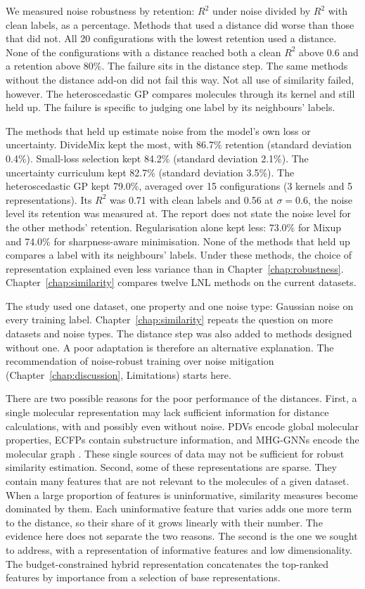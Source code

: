 We measured noise robustness by retention: $R^2$ under noise divided by $R^2$ with clean labels, as a percentage. Methods that used a distance did worse than those that did not. All 20 configurations with the lowest retention used a distance. None of the configurations with a distance reached both a clean $R^2$ above 0.6 and a retention above 80\%. The failure sits in the distance step. The same methods without the distance add-on did not fail this way. Not all use of similarity failed, however. The heteroscedastic GP compares molecules through its kernel and still held up. The failure is specific to judging one label by its neighbours' labels.

The methods that held up estimate noise from the model's own loss or uncertainty. DivideMix \citep{li2020dividemix} kept the most, with 86.7\% retention (standard deviation 0.4\%). Small-loss selection \citep{Han2018} kept 84.2\% (standard deviation 2.1\%). The uncertainty curriculum \citep{Bengio2009} kept 82.7\% (standard deviation 3.5\%). The heteroscedastic GP \citep{liu2020} kept 79.0\%, averaged over 15 configurations (3 kernels and 5 representations). Its $R^2$ was 0.71 with clean labels and 0.56 at $\sigma = 0.6$, the noise level its retention was measured at. The report does not state the noise level for the other methods' retention. Regularisation alone kept less: 73.0\% for Mixup and 74.0\% for sharpness-aware minimisation. None of the methods that held up compares a label with its neighbours' labels. Under these methods, the choice of representation explained even less variance than in Chapter~\ref{chap:robustness}. Chapter~\ref{chap:similarity} compares twelve LNL methods on the current datasets.

The study used one dataset, one property and one noise type: Gaussian noise on every training label. Chapter~\ref{chap:similarity} repeats the question on more datasets and noise types. The distance step was also added to methods designed without one. A poor adaptation is therefore an alternative explanation. The recommendation of noise-robust training over noise mitigation (Chapter~\ref{chap:discussion}, Limitations) starts here.

There are two possible reasons for the poor performance of the distances. First, a single molecular representation may lack sufficient information for distance calculations, with and possibly even without noise. PDVs encode global molecular properties, ECFPs contain substructure information, and MHG-GNNs encode the molecular graph \citep{kishimoto2023}. These single sources of data may not be sufficient for robust similarity estimation. Second, some of these representations are sparse. They contain many features that are not relevant to the molecules of a given dataset. When a large proportion of features is uninformative, similarity measures become dominated by them. Each uninformative feature that varies adds one more term to the distance, so their share of it grows linearly with their number. The evidence here does not separate the two reasons. The second is the one we sought to address, with a representation of informative features and low dimensionality. The budget-constrained hybrid representation concatenates the top-ranked features by importance from a selection of base representations.
